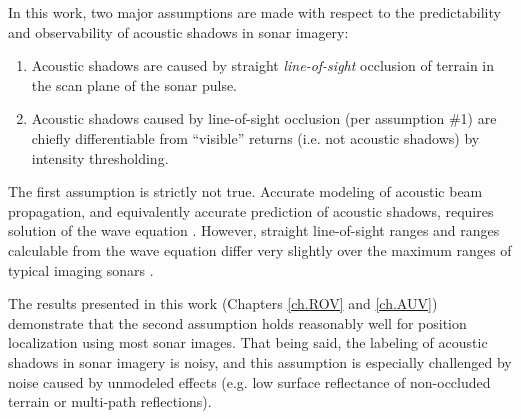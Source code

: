 In this work, two major assumptions are made with respect to the predictability and observability of acoustic shadows in sonar imagery:

\begin{enumerate}
\item Acoustic shadows are caused by straight \emph{line-of-sight} occlusion of terrain in the scan plane of the sonar pulse.
\item Acoustic shadows caused by line-of-sight occlusion (per assumption \#1) are chiefly differentiable from ``visible'' returns (i.e. not acoustic shadows) by intensity thresholding.
\end{enumerate}

\noindent The first assumption is strictly not true.
Accurate modeling of acoustic beam propagation, and equivalently accurate prediction of acoustic shadows, requires solution of the wave equation \cite{etter2013underwater}.
However, straight line-of-sight ranges and ranges calculable from the wave equation differ very slightly over the maximum ranges of typical imaging sonars \cite{Riordan2005}.

The results presented in this work (Chapters \ref{ch.ROV} and \ref{ch.AUV}) demonstrate that the second assumption holds reasonably well for position localization using most sonar images.
That being said, the labeling of acoustic shadows in sonar imagery is noisy, and this assumption is especially challenged by noise caused by unmodeled effects (e.g. low surface reflectance of non-occluded terrain or multi-path reflections).